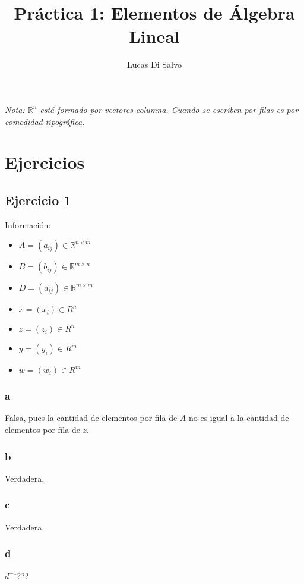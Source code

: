 \documentclass{article}
\title{Práctica 1: Elementos de Álgebra Lineal}
\author{Lucas Di Salvo}
\date{}
\begin{document}
\maketitle

\emph{Nota: $\mathbb{R}^{n}$ está formado por vectores columna. 
    Cuando se escriben por filas es por comodidad tipográfica.}

\section*{Ejercicios}

\subsection*{Ejercicio 1}

Información:

\begin{multicols}{3}
    \begin{itemize}
        \item[] $A = (a_{ij}) \in \mathbb{R}^{n\times m}$
        \item[] $B = (b_{ij}) \in \mathbb{R}^{m\times n}$
        \item[] $D = (d_{ij}) \in \mathbb{R}^{m\times m}$
        \item[] $x = (x_i) \in R^n$
        \item[] $z = (z_i) \in R^n$
        \item[] $y = (y_i) \in R^m$
        \item[] $w = (w_i) \in R^m$
    \end{itemize}
\end{multicols}


\subsubsection*{a}
Falsa, pues la cantidad de elementos por fila de $A$ no es igual a la cantidad de elementos por fila de $z$.

\begin{multicols}{3}
\subsubsection*{b}
Verdadera.
\subsubsection*{c}
Verdadera.
\subsubsection*{d}
$d^{-1}$???
\end{multicols}
\end{document}
